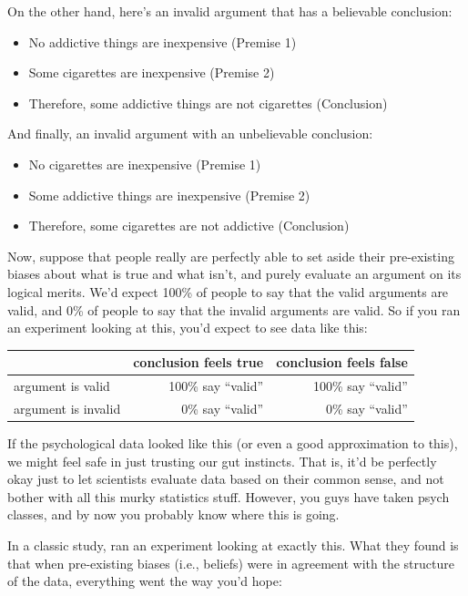 \documentclass[
]{book}
\providecommand{\tightlist}{%
  \setlength{\itemsep}{0pt}\setlength{\parskip}{0pt}}
\begin{document}
On the other hand, here's an invalid argument that has a believable conclusion:

\begin{itemize}
\tightlist
\item
  No addictive things are inexpensive (Premise 1)
\item
  Some cigarettes are inexpensive (Premise 2)
\item
  Therefore, some addictive things are not cigarettes (Conclusion)
\end{itemize}

And finally, an invalid argument with an unbelievable conclusion:

\begin{itemize}
\tightlist
\item
  No cigarettes are inexpensive (Premise 1)
\item
  Some addictive things are inexpensive (Premise 2)
\item
  Therefore, some cigarettes are not addictive (Conclusion)
\end{itemize}

Now, suppose that people really are perfectly able to set aside their pre-existing biases about what is true and what isn't, and purely evaluate an argument on its logical merits. We'd expect 100\% of people to say that the valid arguments are valid, and 0\% of people to say that the invalid arguments are valid. So if you ran an experiment looking at this, you'd expect to see data like this:

\begin{longtable}[]{@{}lrr@{}}
\toprule\noalign{}
& conclusion feels true & conclusion feels false \\
\midrule\noalign{}
\endhead
\bottomrule\noalign{}
\endlastfoot
argument is valid & 100\% say ``valid'' & 100\% say ``valid'' \\
argument is invalid & 0\% say ``valid'' & 0\% say ``valid'' \\
\end{longtable}

If the psychological data looked like this (or even a good approximation to this), we might feel safe in just trusting our gut instincts. That is, it'd be perfectly okay just to let scientists evaluate data based on their common sense, and not bother with all this murky statistics stuff. However, you guys have taken psych classes, and by now you probably know where this is going.

In a classic study, \citet{Evans1983} ran an experiment looking at exactly this. What they found is that when pre-existing biases (i.e., beliefs) were in agreement with the structure of the data, everything went the way you'd hope:
\end{document}
